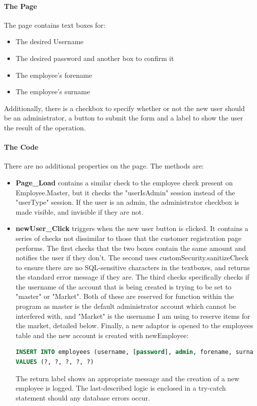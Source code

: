 ﻿\documentclass{article}
\begin{document}
    \paragraph{The Page}
    The page contains text boxes for:
    \begin{itemize}
        \item The desired Username
        \item The desired password and another box to confirm it
        \item The employee's forename
        \item The employee's surname
    \end{itemize}
    Additionally, there is a checkbox to specify whether or not the new user should be an administrator, a button to submit the form and a label to show the user the result of the operation.
    \paragraph{The Code}
    There are no additional properties on the page.
    The methods are:
    \begin{itemize}
        \item \textbf{Page\_Load} contains a similar check to the employee check present on Employee.Master, but it checks the "userIsAdmin" session instead of the "userType" session.
        If the user is an admin, the administrator checkbox is made visible, and invisible if they are not.
        \item \textbf{newUser\_Click} triggers when the new user button is clicked.
        It contains a series of checks not dissimilar to those that the customer registration page performs.
        The first checks that the two boxes contain the same amount and notifies the user if they don't.
        The second uses customSecurity.sanitizeCheck to ensure there are no SQL-sensitive characters in the textboxes, and returns the standard error message if they are.
        The third checks specifically checks if the username of the account that is being created is trying to be set to "master" or "Market".
        Both of these are reserved for function within the program as master is the default administrator account which cannot be interfered with, and "Market" is the username I am using to reserve items for the market, detailed below.
        Finally, a new adaptor is opened to the employees table and the new account is created with newEmployee:
        \begin{lstlisting}[language=SQL]
INSERT INTO employees (username, [password], admin, forename, surname)
VALUES (?, ?, ?, ?, ?)
        \end{lstlisting}
        The return label shows an appropriate message and the creation of a new employee is logged.
        The last-described logic is enclosed in a try-catch statement should any database errors occur.
    \end{itemize}
\end{document}
